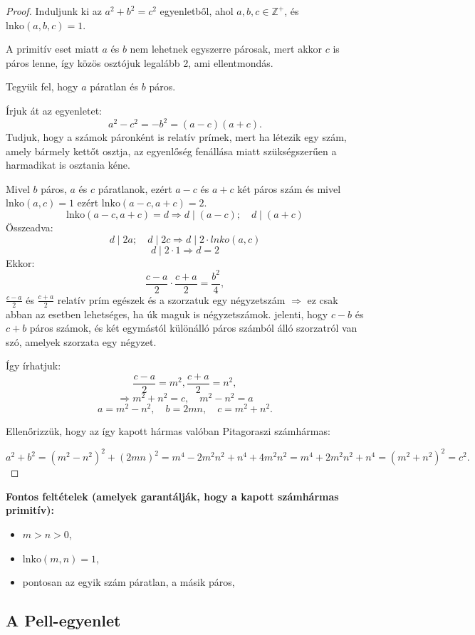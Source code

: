\begin{proof}
Induljunk ki az $a^{2}+b^{2}=c^{2}$ egyenletből, ahol $a,b,c\in\mathbb{Z}^{+}$,
és $\mathrm{lnko}(a,b,c)=1$.

A primitív eset miatt $a$ és $b$ nem lehetnek egyszerre párosak,
mert akkor $c$ is páros lenne, így közös osztójuk legalább 2, ami
ellentmondás.

Tegyük fel, hogy $a$ páratlan és $b$ páros.

Írjuk át az egyenletet:
\[
a^{2}-c^{2}=-b^{2}=(a-c)(a+c).
\]
Tudjuk, hogy a számok páronként is relatív prímek, mert ha létezik
egy szám, amely bármely kettőt osztja, az egyenlőség fenállása miatt
szükségszerűen a harmadikat is osztania kéne.

Mivel $b$ páros, $a$ és $c$ páratlanok, ezért $a-c$ és $a+c$
két páros szám és mivel $\mathrm{lnko}(a,c)=1$ ezért $\mathrm{lnko}(a-c,a+c)=2$.
\[
\mathrm{lnko}(a-c,a+c)=d\Rightarrow d\mid(a-c);\quad d\mid(a+c)
\]
Összeadva:
\[
d\mid2a;\quad d\mid2c\Rightarrow d\mid2\cdot{lnko}(a,c)
\]
\[
d\mid2\cdot1\Rightarrow d=2
\]
Ekkor:
\[
\frac{c-a}{2}\cdot\frac{c+a}{2}=\frac{b^{2}}{4},
\]
$\frac{c-a}{2}$ és $\frac{c+a}{2}$ relatív prím egészek és a szorzatuk
egy négyzetszám $\Rightarrow$ ez csak abban az esetben lehetséges,
ha úk maguk is négyzetszámok. jelenti, hogy $c-b$ és $c+b$ páros
számok, és két egymástól különálló páros számból álló szorzatról van
szó, amelyek szorzata egy négyzet.

Így írhatjuk:
\[
\frac{c-a}{2}=m^{2},\frac{c+a}{2}=n^{2},
\]
\[
\Rightarrow m^{2}+n^{2}=c,\quad m^{2}-n^{2}=a
\]
\[
a=m^{2}-n^{2},\quad b=2mn,\quad c=m^{2}+n^{2}.
\]


Ellenőrizzük, hogy az így kapott hármas valóban Pitagoraszi számhármas:

\[
a^{2}+b^{2}=(m^{2}-n^{2})^{2}+(2mn)^{2}=m^{4}-2m^{2}n^{2}+n^{4}+4m^{2}n^{2}=m^{4}+2m^{2}n^{2}+n^{4}=(m^{2}+n^{2})^{2}=c^{2}.
\]
\end{proof}
\textbf{Fontos feltételek (amelyek garantálják, hogy a kapott számhármas primitív):}
\begin{itemize}
\item $m>n>0$, 
\item $\mathrm{lnko}(m,n)=1$, 
\item pontosan az egyik szám páratlan, a másik páros, 
\end{itemize}

\subsection*{A Pell-egyenlet}

